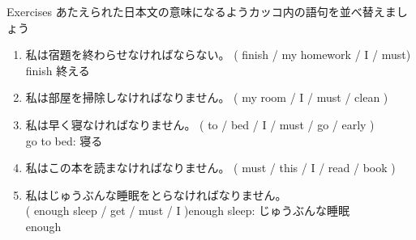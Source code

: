 \documentclass[aspectratio=169,xcolor={dvipsnames,table}]{beamer}
\newcommand{\myaudio}[1]{\href{#1}{\faVolumeUp}}
\begin{document}
\begin{frame}[plain]{Exercises}
あたえられた日本文の意味になるようカッコ内の語句を並べ替えましょう\hfill{\myaudio{./audio/013_must_02.mp3}}
\begin{enumerate}
 \item {\small 私は宿題を終わらせなければならない。}
( finish / my homework / I / must)\\
\hfill{}{\scriptsize finish  終える}
 \item {\small 私は部屋を掃除しなければなりません。}
( my room / I / must / clean )\\
 \item {\small 私は早く寝なければなりません。}
( to / bed / I / must / go / early )\\
\hfill{}{\scriptsize go to bed: 寝る}
 \item {\small 私はこの本を読まなければなりません。}
( must / this / I / read / book )\\
 \item {\small 私はじゅうぶんな睡眠をとらなければなりません。}\\
( enough sleep / get / must / I )\hfill{\scriptsize enough sleep: じゅうぶんな睡眠}\\
\hfill{}{\scriptsize enough }
\end{enumerate}
\end{frame}
\end{document}
